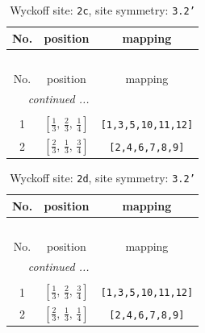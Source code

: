 \documentclass[fleqn,8pt]{jsarticle}
\begin{document}
\renewcommand{\arraystretch}{1.2}
\begin{longtable}{ccc}
\caption{Wyckoff site: {\tt 2c}, site symmetry: {\tt 3.2'}}
 \\
 \hline \hline
No. & position & mapping \\ \hline \endfirsthead

\multicolumn{2}{l}{\tablename\ \thetable{}} \\
 \hline \hline
No. & position & mapping \\ \hline \endhead

 \hline \hline
\multicolumn{2}{r}{\footnotesize\it continued ...} \\ \endfoot

 \hline \hline
\multicolumn{2}{r}{} \\ \endlastfoot

1 & $\left[ \frac{1}{3},\, \frac{2}{3},\, \frac{1}{4} \right]$ & {\tt [1,3,5,10,11,12]} \\ \hline
2 & $\left[ \frac{2}{3},\, \frac{1}{3},\, \frac{3}{4} \right]$ & {\tt [2,4,6,7,8,9]} \\
\end{longtable}
\renewcommand{\arraystretch}{1.2}
\begin{longtable}{ccc}
\caption{Wyckoff site: {\tt 2d}, site symmetry: {\tt 3.2'}}
 \\
 \hline \hline
No. & position & mapping \\ \hline \endfirsthead

\multicolumn{2}{l}{\tablename\ \thetable{}} \\
 \hline \hline
No. & position & mapping \\ \hline \endhead

 \hline \hline
\multicolumn{2}{r}{\footnotesize\it continued ...} \\ \endfoot

 \hline \hline
\multicolumn{2}{r}{} \\ \endlastfoot

1 & $\left[ \frac{1}{3},\, \frac{2}{3},\, \frac{3}{4} \right]$ & {\tt [1,3,5,10,11,12]} \\ \hline
2 & $\left[ \frac{2}{3},\, \frac{1}{3},\, \frac{1}{4} \right]$ & {\tt [2,4,6,7,8,9]} \\
\end{longtable}
\renewcommand{\arraystretch}{1.2}
\end{document}
